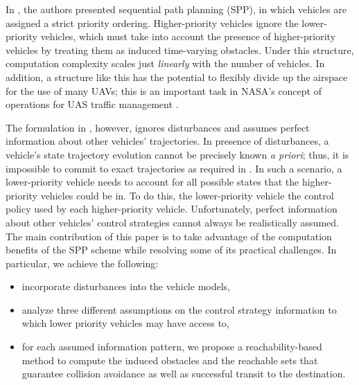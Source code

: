 In \cite{Chen15}, the authors presented sequential path planning (SPP), in which vehicles are assigned a strict priority ordering. Higher-priority vehicles ignore the lower-priority vehicles, which must take into account the presence of higher-priority vehicles by treating them as induced time-varying obstacles. Under this structure, computation complexity scales just \textit{linearly} with the number of vehicles. In addition, a structure like this has the potential to flexibly divide up the airspace for the use of many UAVs; this is an important task in NASA's concept of operations for UAS traffic management \cite{Kopardekar16}. 

The formulation in \cite{Chen15}, however, ignores disturbances and assumes perfect information about other vehicles' trajectories. In presence of disturbances, a vehicle's state trajectory evolution cannot be precisely known \textit{a priori}; thus, it is impossible to commit to exact trajectories as required in \cite{Chen15}. In such a scenario, a lower-priority vehicle needs to account for all possible states that the higher-priority vehicles could be in. To do this, the lower-priority vehicle  the control policy used by each higher-priority vehicle. Unfortunately, perfect information about other vehicles' control strategies cannot always be realistically assumed.  The main contribution of this paper is to take advantage of the computation benefits of the SPP scheme while resolving some of its practical challenges. In particular, we achieve the following:
\begin{itemize}
\item incorporate disturbances into the vehicle models,
\item analyze three different assumptions on the control strategy information to which lower priority vehicles may have access to,
\item for each assumed information pattern, we propose a reachability-based method to compute the induced obstacles and the reachable sets that guarantee collision avoidance as well as successful transit to the destination.
\end{itemize}